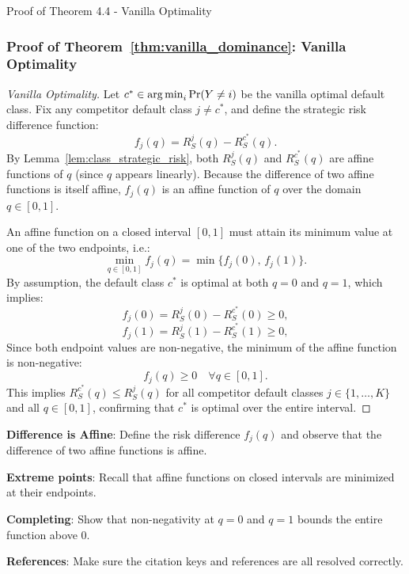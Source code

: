 \begin{sourceblock}{Proof of Theorem 4.4 - Vanilla Optimality}
\subsubsection*{Proof of Theorem~\ref{thm:vanilla_dominance}: Vanilla Optimality}
\label{app:proof_vanilla_dominance}
\begin{proof}[Vanilla Optimality]
Let $c^* \in \operatorname*{arg\,min}_i \Pr(Y \ne i)$ be the vanilla optimal default class. Fix any competitor default class $j \ne c^*$, and define the strategic risk difference function:
\begin{equation}
    f_j(q) = R^j_S(q) - R^{c^*}_S(q).
\end{equation}
By Lemma~\ref{lem:class_strategic_risk}, both $R^j_S(q)$ and $R^{c^*}_S(q)$ are affine functions of $q$ (since $q$ appears linearly). Because the difference of two affine functions is itself affine, $f_j(q)$ is an affine function of $q$ over the domain $q \in [0, 1]$.

An affine function on a closed interval $[0, 1]$ must attain its minimum value at one of the two endpoints, i.e.:
\begin{equation}
    \min_{q \in [0, 1]} f_j(q) = \min\{ f_j(0), \, f_j(1) \}.
\end{equation}
By assumption, the default class $c^*$ is optimal at both $q = 0$ and $q = 1$, which implies:
\begin{equation}
    f_j(0) = R^j_S(0) - R^{c^*}_S(0) \ge 0,
\end{equation}
\begin{equation}
    f_j(1) = R^j_S(1) - R^{c^*}_S(1) \ge 0,
\end{equation}
Since both endpoint values are non-negative, the minimum of the affine function is non-negative:
\begin{equation}
    f_j(q) \ge 0 \quad \forall q \in [0, 1].
\end{equation}
This implies $R^{c^*}_S(q) \le R^j_S(q)$ for all competitor default classes $j \in \{1, \dots, K\}$ and all $q \in [0, 1]$, confirming that $c^*$ is optimal over the entire interval.
\end{proof}
\end{sourceblock}

\begin{guideblock}
\item \textbf{Difference is Affine}: Define the risk difference $f_j(q)$ and observe that the difference of two affine functions is affine.
\item \textbf{Extreme points}: Recall that affine functions on closed intervals are minimized at their endpoints.
\item \textbf{Completing}: Show that non-negativity at $q=0$ and $q=1$ bounds the entire function above $0$.
\item \textbf{References}: Make sure the citation keys and references are all resolved correctly.
\end{guideblock}


